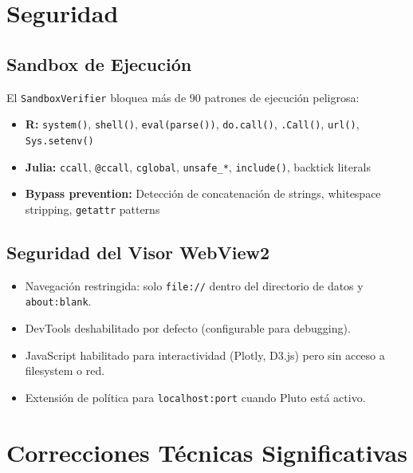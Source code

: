 \documentclass[12pt, a4paper]{report}
\begin{document}
\chapter{Seguridad}

\section{Sandbox de Ejecución}

El \texttt{SandboxVerifier} bloquea más de 90 patrones de ejecución peligrosa:

\begin{itemize}
    \item \textbf{R:} \texttt{system()}, \texttt{shell()}, \texttt{eval(parse())}, \texttt{do.call()}, \texttt{.Call()}, \texttt{url()}, \texttt{Sys.setenv()}
    \item \textbf{Julia:} \texttt{ccall}, \texttt{@ccall}, \texttt{cglobal}, \texttt{unsafe\_*}, \texttt{include()}, backtick literals
    \item \textbf{Bypass prevention:} Detección de concatenación de strings, whitespace stripping, \texttt{getattr} patterns
\end{itemize}

\section{Seguridad del Visor WebView2}

\begin{itemize}
    \item Navegación restringida: solo \texttt{file://} dentro del directorio de datos y \texttt{about:blank}.
    \item DevTools deshabilitado por defecto (configurable para debugging).
    \item JavaScript habilitado para interactividad (Plotly, D3.js) pero sin acceso a filesystem o red.
    \item Extensión de política para \texttt{localhost:port} cuando Pluto está activo.
\end{itemize}

\chapter{Correcciones Técnicas Significativas}
\end{document}
